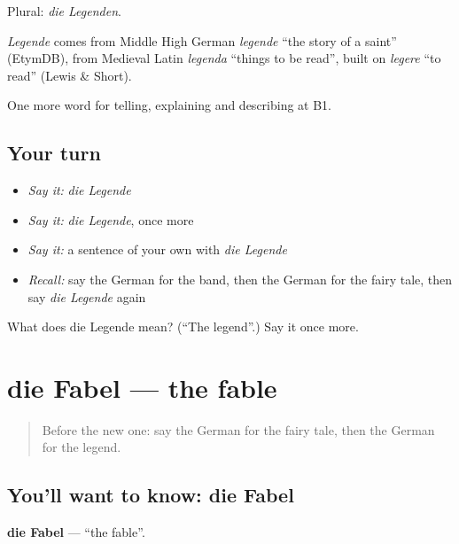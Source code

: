 Plural: \emph{die Legenden}.

\begin{cousinweb}
\emph{Legende} comes from Middle High German \emph{legende} \textquotedblleft{}the story of a saint\textquotedblright{} (EtymDB), from Medieval Latin \emph{legenda} \textquotedblleft{}things to be read\textquotedblright{}, built on \emph{legere} \textquotedblleft{}to read\textquotedblright{} (Lewis \& Short).
\end{cousinweb}

\begin{grammarlens}[title={What you've built}]
One more word for telling, explaining and describing at B1.
\end{grammarlens}

\subsection*{Your turn}
\begin{itemize}
\raggedright
  \item \emph{Say it:} \emph{die Legende}
  \item \emph{Say it:} \emph{die Legende}, once more
  \item \emph{Say it:} a sentence of your own with \emph{die Legende}
  \item \emph{Recall:} say the German for the band, then the German for the fairy tale, then say \emph{die Legende} again
\end{itemize}

\begin{tcolorbox}[breakable,colback=teal!4,colframe=teal!35!black,title={Before you move on}]
What does die Legende mean? (\textquotedblleft{}The legend\textquotedblright{}.) Say it once more.
\end{tcolorbox}
\section[die Fabel]{die Fabel — the fable}

\label{lesson:GE-C313-fabel}



\begin{quote}
Before the new one: say the German for the fairy tale, then the German for the legend.
\end{quote}

\subsection*{You'll want to know: die Fabel}
\textbf{die Fabel} — \textquotedblleft{}the fable\textquotedblright{}.

